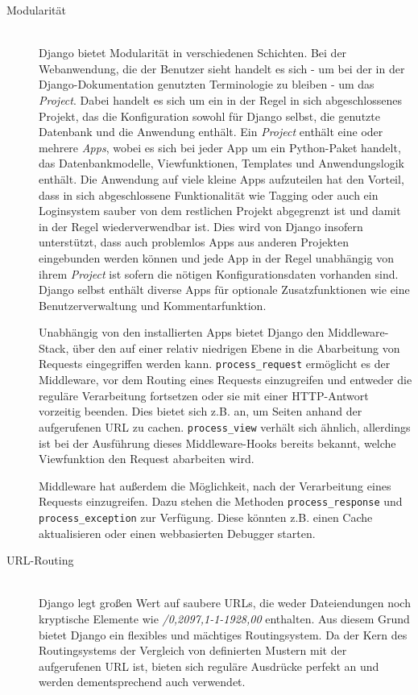 \begin{description}
\item[Modularität] \hfill \\
Django bietet Modularität in verschiedenen Schichten. Bei der Webanwendung, die der Benutzer sieht
handelt es sich - um bei der in der Django-Dokumentation genutzten Terminologie zu bleiben - um das
\emph{Project}. Dabei handelt es sich um ein in der Regel in sich abgeschlossenes Projekt, das die
Konfiguration sowohl für Django selbst, die genutzte Datenbank und die Anwendung enthält. Ein
\emph{Project} enthält eine oder mehrere \emph{Apps}, wobei es sich bei jeder App um ein
Python-Paket handelt, das Datenbankmodelle, Viewfunktionen, Templates und Anwendungslogik enthält.
Die Anwendung auf viele kleine Apps aufzuteilen hat den Vorteil, dass in sich
abgeschlossene Funktionalität wie Tagging oder auch ein Loginsystem sauber von dem
restlichen Projekt abgegrenzt ist und damit in der Regel wiederverwendbar ist. Dies wird von Django
insofern unterstützt, dass auch problemlos Apps aus anderen Projekten eingebunden werden können und
jede App in der Regel unabhängig von ihrem \emph{Project} ist sofern die nötigen Konfigurationsdaten
vorhanden sind. Django selbst enthält diverse Apps für optionale Zusatzfunktionen wie eine
Benutzerverwaltung und Kommentarfunktion.

Unabhängig von den installierten Apps bietet Django den Middleware-Stack, über den auf einer relativ
niedrigen Ebene in die Abarbeitung von Requests eingegriffen werden kann.
\lstinline{process_request} ermöglicht es der Middleware, vor dem Routing eines Requests
einzugreifen und entweder die reguläre Verarbeitung fortsetzen oder sie mit einer HTTP-Antwort
vorzeitig beenden. Dies bietet sich z.B. an, um Seiten anhand der aufgerufenen URL zu cachen.
\lstinline{process_view} verhält sich ähnlich, allerdings ist bei der Ausführung dieses
Middleware-Hooks bereits bekannt, welche Viewfunktion den Request abarbeiten wird.

Middleware hat außerdem die Möglichkeit, nach der Verarbeitung eines Requests einzugreifen. Dazu
stehen die Methoden \lstinline{process_response} und \lstinline{process_exception} zur Verfügung.
Diese könnten z.B. einen Cache aktualisieren oder einen webbasierten Debugger starten.


\item[URL-Routing] \hfill \\
Django legt großen Wert auf saubere URLs, die weder Dateiendungen noch kryptische Elemente wie
\emph{/0,2097,1-1-1928,00} enthalten. Aus diesem Grund bietet Django ein flexibles
und mächtiges Routingsystem. Da der Kern des Routingsystems der Vergleich von definierten Mustern
mit der aufgerufenen URL ist, bieten sich reguläre Ausdrücke perfekt an und werden dementsprechend
auch verwendet.


\end{description}
